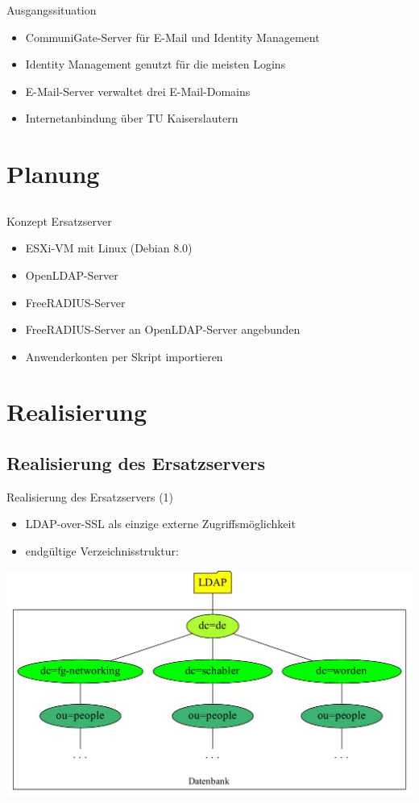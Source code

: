 \documentclass[presentation,svgnames,12pt]{beamer}
\begin{document}
\begin{frame}{Ausgangssituation}
\begin{itemize}
	\item CommuniGate-Server für E-Mail und Identity Management
	\item Identity Management genutzt für die meisten Logins
	\item E-Mail-Server verwaltet drei E-Mail-Domains
	\item Internetanbindung über TU Kaiserslautern
\end{itemize}
\end{frame}


\section{Planung}
\subsection{}
\begin{frame}{Konzept Ersatzserver}
\begin{itemize}
	\item ESXi-VM mit Linux (Debian 8.0)
	\item OpenLDAP-Server
	\item FreeRADIUS-Server
	\item FreeRADIUS-Server an OpenLDAP-Server angebunden
	\item Anwenderkonten per Skript importieren
\end{itemize}
\end{frame}


\section{Realisierung}
\subsection{Realisierung des Ersatzservers}
\begin{frame}{Realisierung des Ersatzservers (1)}
\begin{itemize}
	\item LDAP-over-SSL als einzige externe Zugriffsmöglichkeit
	\item endgültige Verzeichnisstruktur:
\end{itemize}
\centering
\includegraphics[width=\textwidth]{Bilder/LDAP-fgn.pdf}
\end{frame}
\end{document}
